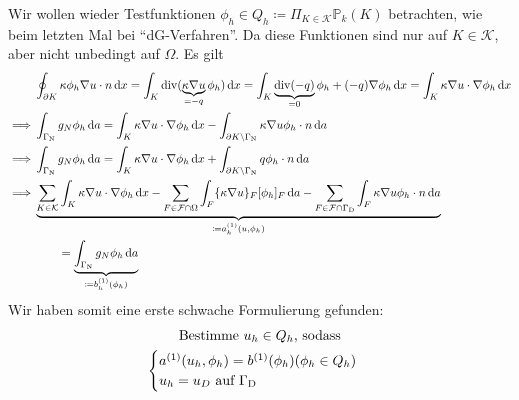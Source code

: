 Wir wollen wieder Testfunktionen $ \phi_h \in Q_h \coloneqq \Pi_{K \in \mathcal{K}} \mathbb{P}_k(K)$ betrachten, wie beim letzten Mal bei \enquote{dG-Verfahren}. Da diese Funktionen sind nur auf $ K \in \mathcal{K} $, aber nicht unbedingt auf $ \Omega $. Es gilt
\begin{align*}
	&\oint_{\partial K} \kappa \phi_h \nabla u \cdot n \diff x = \int_K \dive(\underbrace{\kappa \nabla u}_{= -q} \phi_h) \diff x = \int_K \underbrace{\dive(-q)}_{=0} \phi_h + (-q) \nabla \phi_h \diff x = \int_K \kappa \nabla u \cdot \nabla \phi_h \diff x\\
	\implies &\int_{\GammaN} g_N \phi_h \diff a = \int_K \kappa \nabla u \cdot \nabla \phi_h \diff x - \int_{\partial K \setminus \GammaN} \kappa \nabla u \phi_h \cdot n \diff a\\
	\implies &\int_{\GammaN} g_N \phi_h \diff a = \int_K \kappa \nabla u \cdot \nabla \phi_h \diff x + \int_{\partial K \setminus \GammaN} q \phi_h \cdot n \diff a\\
	\implies &\underbrace{\sum_{K \in \mathcal{K}} \int_K \kappa \nabla u \cdot \nabla \phi_h \diff x - \sum_{F \in \mathcal{F} \cap \Omega} \int_{F} \{\kappa \nabla u \}_F [\phi_h]_F \diff a - \sum_{F \in \mathcal{F} \cap \GammaD} \int_{F} \kappa \nabla u \phi_h \cdot n \diff a}_{\coloneqq a^{(1)}_h(u,\phi_h)}\\
	&\qquad = \underbrace{\int_{\GammaN} g_N \phi_h \diff a}_{\coloneqq b^{(1)}_h(\phi_h)}\\
\end{align*}
Wir haben somit eine erste schwache Formulierung gefunden:
\begin{gather*}
\text{Bestimme } u_h \in Q_h \text{, sodass}\\
\begin{cases}
	a^{(1)}(u_h,\phi_h) = b^{(1)}(\phi_h) (\phi_h \in Q_h)\\
	u_h = u_D \text{ auf }\Gamma_{\text{D}}
\end{cases}
\end{gather*}

